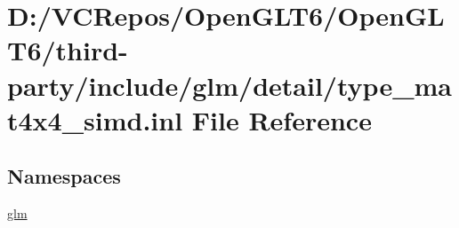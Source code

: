 \hypertarget{type__mat4x4__simd_8inl}{}\section{D\+:/\+V\+C\+Repos/\+Open\+G\+L\+T6/\+Open\+G\+L\+T6/third-\/party/include/glm/detail/type\+\_\+mat4x4\+\_\+simd.inl File Reference}
\label{type__mat4x4__simd_8inl}
\subsection*{Namespaces}
\begin{DoxyCompactItemize}
\item 
 \mbox{\hyperlink{namespaceglm}{glm}}
\end{DoxyCompactItemize}
